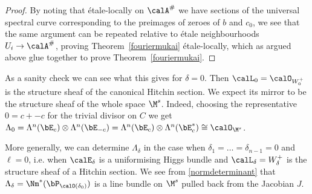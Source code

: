 \begin{proof}
	By noting that   \'etale-locally on $\calA^\#$  we have sections of the universal spectral curve corresponding to the preimages of zeroes of $b$ and $c_0$, we see that the same argument can be repeated relative to \'etale neighbourhoods $U_i\to \calA^\#$, proving Theorem~\ref{fouriermukai} \'etale-locally, which as argued above glue together to prove Theorem~\ref{fouriermukai}.
\end{proof}

\begin{remark}
\notready As a sanity check we can see what this gives for $\delta=0$. Then $\calL_0=\calO_{W^+_0}$ is the structure sheaf of the canonical Hitchin section. We expect its mirror to be the structure sheaf of the whole space $\M^s$. Indeed, choosing the representative $0=c+-c$ for the trivial divisor on $C$ we get $\Lambda_0=\Lambda^n(\bE_{c})\otimes \Lambda^n(\bE_{-c})=\Lambda^n(\bE_{c})\otimes \Lambda^n(\bE^*_{c})\cong \calO_{\M^s}$.

	More generally, we can determine $\Lambda_\delta$ in the case when $\delta_1=\dots=\delta_{n-1}=0$ and $\ell=0$, i.e. when $\calE_\delta$ is a uniformising Higgs bundle and $\calL_\delta=W^+_\delta$ is the structure sheaf of a Hitchin section. We see from \eqref{normdeterminant} that $\Lambda_\delta=\Nm^*(\bP_{\calO(\delta_0)})$ is a line bundle on $\M^s$ pulled back from the Jacobian $J$.
\end{remark}

